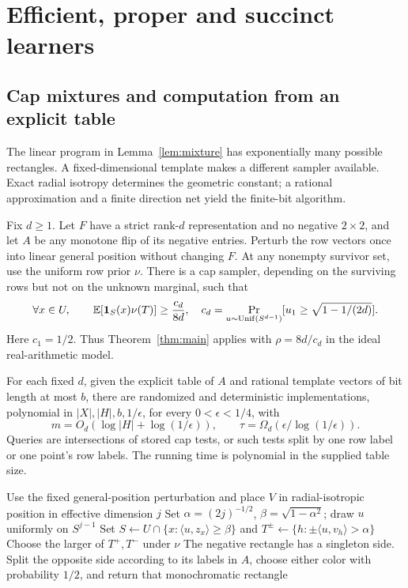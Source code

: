 \section{Efficient, proper and succinct learners}\label{sec:learners}
\subsection{Cap mixtures and computation from an explicit table}\label{sec:caps}
The linear program in Lemma~\ref{lem:mixture} has exponentially many possible rectangles. A fixed-dimensional template makes a different sampler available. Exact radial isotropy determines the geometric constant; a rational approximation and a finite direction net yield the finite-bit algorithm.


\begin{theorem}\label{thm:caps}
Fix $d\ge1$. Let $F$ have a strict rank-$d$ representation and no negative $2\times2$, and let $A$ be any monotone flip of its negative entries. Perturb the row vectors once into linear general position without changing $F$. At any nonempty survivor set, use the uniform row prior $\nu$. There is a cap sampler, depending on the surviving rows but not on the unknown marginal, such that
\begin{equation}\label{eq:capcoverage}
 \forall x\in U,\qquad \mathbb E[\mathbf 1_S(x)\nu(T)]\ge\frac{c_d}{8d},
 \quad c_d=\Pr_{u\sim\mathrm{Unif}(S^{d-1})}
 [u_1\ge\sqrt{1-1/(2d)}].
\end{equation}
Here $c_1=1/2$. Thus Theorem~\ref{thm:main} applies with $\rho=8d/c_d$ in the ideal real-arithmetic model.

For each fixed $d$, given the explicit table of $A$ and rational template vectors of bit length at most $b$, there are randomized and deterministic implementations, polynomial in $|X|,|H|,b,1/\epsilon$, for every $0<\epsilon<1/4$, with
\[
 m=O_d(\log|H|+\log(1/\epsilon)),\qquad
 \tau=\Omega_d(\epsilon/\log(1/\epsilon)).
\]
Queries are intersections of stored cap tests, or such tests split by one row label or one point's row labels. The running time is polynomial in the supplied table size.
\end{theorem}


\begin{algorithm}[t]
\caption{Cap sampler from a strict template}\label{alg:caps}
Use the fixed general-position perturbation and place $V$ in radial-isotropic position in effective dimension $j$\;
Set $\alpha=(2j)^{-1/2}$, $\beta=\sqrt{1-\alpha^2}$; draw $u$ uniformly on $S^{j-1}$\;
Set $S\gets U\cap\{x:\langle u,z_x\rangle\ge\beta\}$ and $T^\pm\gets\{h:\pm\langle u,v_h\rangle>\alpha\}$\;
Choose the larger of $T^+,T^-$ under $\nu$\;
The negative rectangle has a singleton side. Split the opposite side according to its labels in $A$, choose either color with probability $1/2$, and return that monochromatic rectangle\;
\end{algorithm}
